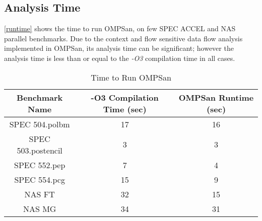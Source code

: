 \subsection{Analysis Time}
\autoref{runtime} shows the time to run OMPSan, on few SPEC ACCEL and 
NAS parallel benchmarks. 
Due to the context and flow sensitive data flow analysis implemented in 
OMPSan, 
its analysis time can be significant; 
however the analysis time is less than or equal to the \textit{-O3}
compilation time in all cases.
\begin{table} \vspace{-30pt}
    \caption{Time to Run OMPSan}
    \label{runtime}
    \begin{center}
        \scriptsize
        \begin{tabular}{ | c | c | c |}
            \hline
           Benchmark Name &  -O3 Compilation Time (sec)
           & OMPSan Runtime (sec) \\ \hline    
           SPEC 504.polbm & 17 & 16 \\ \hline    
           SPEC 503.postencil & 3 & 3 \\ \hline    
           SPEC 552.pep  & 7 & 4 \\ \hline    
           SPEC 554.pcg & 15 & 9\\ \hline    
           NAS FT & 32 & 15 \\ \hline    
           NAS MG & 34 & 31              \\ \hline                       
        \end{tabular}        
    \end{center}
\end{table}\vspace{-40pt}
